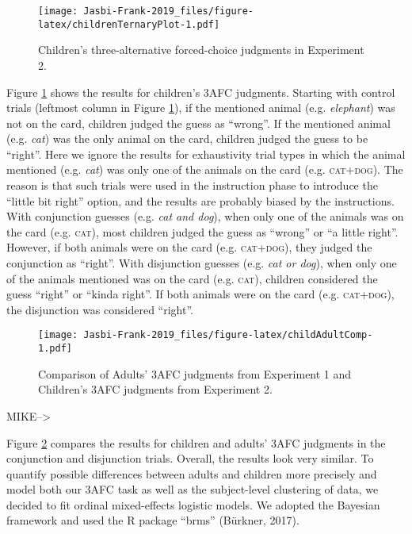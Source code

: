 \documentclass[,man,floatsintext]{apa6}
\begin{document}
\begin{figure}
\centering
\texttt{[image: Jasbi-Frank-2019\_files/figure-latex/childrenTernaryPlot-1.pdf]}
\caption{\label{fig:childrenTernaryPlot}Children's three-alternative forced-choice judgments in Experiment 2.}
\end{figure}

Figure \ref{fig:childrenTernaryPlot} shows the results for children's 3AFC judgments. Starting with control trials (leftmost column in Figure \ref{fig:childrenTernaryPlot}), if the mentioned animal (e.g. \emph{elephant}) was not on the card, children judged the guess as \enquote{wrong}. If the mentioned animal (e.g. \emph{cat}) was the only animal on the card, children judged the guess to be \enquote{right}. Here we ignore the results for exhaustivity trial types in which the animal mentioned (e.g. \emph{cat}) was only one of the animals on the card (e.g. \textsc{cat+dog}). The reason is that such trials were used in the instruction phase to introduce the \enquote{little bit right} option, and the results are probably biased by the instructions. With conjunction guesses (e.g. \emph{cat and dog}), when only one of the animals was on the card (e.g. \textsc{cat}), most children judged the guess as \enquote{wrong} or \enquote{a little right}. However, if both animals were on the card (e.g. \textsc{cat+dog}), they judged the conjunction as \enquote{right}. With disjunction guesses (e.g. \emph{cat or dog}), when only one of the animals mentioned was on the card (e.g. \textsc{cat}), children considered the guess \enquote{right} or \enquote{kinda right}. If both animals were on the card (e.g. \textsc{cat+dog}), the disjunction was considered \enquote{right}.

\begin{figure}
\centering
\texttt{[image: Jasbi-Frank-2019\_files/figure-latex/childAdultComp-1.pdf]}
\caption{\label{fig:childAdultComp}Comparison of Adults' 3AFC judgments from Experiment 1 and Children's 3AFC judgments from Experiment 2.}
\end{figure}

MIKE--\textgreater{}

Figure \ref{fig:childAdultComp} compares the results for children and adults' 3AFC judgments in the conjunction and disjunction trials. Overall, the results look very similar. To quantify possible differences between adults and children more precisely and model both our 3AFC task as well as the subject-level clustering of data, we decided to fit ordinal mixed-effects logistic models. We adopted the Bayesian framework and used the R package \enquote{brms} (Bürkner, 2017).
\end{document}
